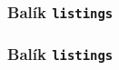 \subsubsection{Balík \texttt{listings}}
\begin{frame}
	\frametitle{Balík \texttt{listings}}
\end{frame}

\endinput
